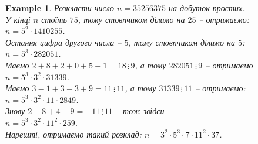 \documentclass[a4paper, 14pt]{extarticle}
\theoremstyle{theoremdd}
\theoremstyle{theoremdd}
\theoremstyle{theoremdd}
\theoremstyle{theoremdd}
\newtheorem{example}[theorem]{Example}
\theoremstyle{theoremdd}
\theoremstyle{theoremdd}
\theoremstyle{theoremdd}
\theoremstyle{theoremdd}
\begin{document}
\begin{example}
Розкласти число $n = 35256375$ на добуток простих.\\
У кінці $n$ стоїть $75$, тому стовпчиком ділимо на $25$ -- отримаємо:\\
$n = 5^2 \cdot 1410255$.\\
Остання цифра другого числа -- $5$, тому стовпчиком ділимо на $5$:\\
$n = 5^3 \cdot 282051$.\\
Маємо $2+8+2+0+5+1 =18 \, \vdots \, 9$, а тому $282051 \, \vdots \, 9$ -- отримаємо\\
$n = 5^3 \cdot 3^2 \cdot 31339$.\\
Маємо $3-1+3-3+9 = 11 \, \vdots \, 11$, а тому $31339 \, \vdots \, 11$ -- отримаємо:\\
$n = 5^3 \cdot 3^2 \cdot 11 \cdot 2849$.\\
Знову $2-8+4-9 = -11 \, \vdots \, 11$ -- тож звідси\\
$n = 5^3 \cdot 3^2 \cdot 11^2 \cdot 259$.\\
Нарешті, отримаємо такий розклад: $n = 3^2 \cdot 5^3 \cdot 7 \cdot 11^2 \cdot 37$.
\end{example}
\end{document}
